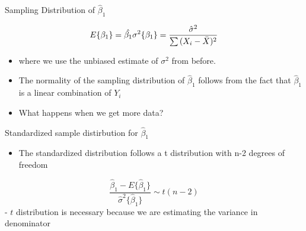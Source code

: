\documentclass[
  ignorenonframetext,
]{beamer}
\newenvironment{Shaded}{\begin{snugshade}}{\end{snugshade}}
\newcommand{\DecValTok}[1]{\textcolor[rgb]{0.00,0.00,0.81}{#1}}
\newcommand{\KeywordTok}[1]{\textcolor[rgb]{0.13,0.29,0.53}{\textbf{#1}}}
\newcommand{\NormalTok}[1]{#1}
\newcommand{\OperatorTok}[1]{\textcolor[rgb]{0.81,0.36,0.00}{\textbf{#1}}}
\newcommand{\StringTok}[1]{\textcolor[rgb]{0.31,0.60,0.02}{#1}}
\providecommand{\tightlist}{%
  \setlength{\itemsep}{0pt}\setlength{\parskip}{0pt}}
\begin{document}
\begin{frame}[fragile]{Sampling Distribution of \(\hat\beta_1\)}
\protect\hypertarget{sampling-distribution-of-hatbeta_1}{}

\[
E\{\beta_1\} = \hat{\beta_1} \\
\sigma^2\{\beta_1\} = \frac{\hat\sigma^2}{\sum{(X_i - \bar{X})^2}}
\]

\begin{itemize}
\tightlist
\item
  where we use the unbiased estimate of \(\sigma^2\) from before.
\end{itemize}

\begin{Shaded}
\end{Shaded}

\begin{itemize}
\item
  The normality of the sampling distribution of \(\hat\beta_1\) follows
  from the fact that \(\hat\beta_1\) is a linear combination of \(Y_i\)
\item
  What happens when we get more data?
\end{itemize}

\end{frame}

\begin{frame}{Standardized sample distirbution for \(\hat\beta_1\)}
\protect\hypertarget{standardized-sample-distirbution-for-hatbeta_1}{}

\begin{itemize}
\tightlist
\item
  The standardized distribution follows a t distribution with n-2
  degrees of freedom
\end{itemize}

\[
\frac{\hat\beta_1 - E\{\hat\beta_1\}}{\hat\sigma^2\{\hat\beta_1\}} \sim t(n-2) 
\] - \(t\) distribution is necessary because we are estimating the
variance in denominator

\end{frame}
\end{document}
